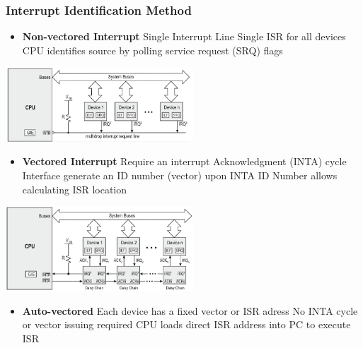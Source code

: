 \begin{minipage}{11cm}
        \subsubsection{Interrupt Identification Method}
    \begin{itemize}
		\item \textbf{Non-vectored Interrupt}
		\subitem Single Interrupt Line
		\subitem Single \acs{ISR} for all devices
		\subitem \acs{CPU} identifies source by polling service request (\acs{SRQ}) flags
    \end{itemize}
\end{minipage}	
	\begin{minipage}{8cm}
		\hspace{0.5cm}\includegraphics[width=7cm]{images/nonvectored.png}
	\end{minipage}
	\begin{minipage}{11cm}
            \begin{itemize}
		\item \textbf{Vectored Interrupt}
		\subitem Require an interrupt Acknowledgment (\acs{INTA}) cycle
		\subitem Interface generate an ID number (vector) upon \acs{INTA}
		\subitem ID Number allows calculating \acs{ISR} location
    \end{itemize}
	\end{minipage}
		\begin{minipage}{8cm}
		\hspace{0.5cm}\includegraphics[width=7cm]{images/vectored.png}
	\end{minipage}
    \begin{itemize}
	\item \textbf{Auto-vectored}
	\subitem Each device has a fixed vector or \acs{ISR} adress
	\subitem No \acs{INTA} cycle or vector issuing required
	\subitem \acs{CPU} loads direct \acs{ISR} address into \acs{PC} to execute \acs{ISR}
\end{itemize}

